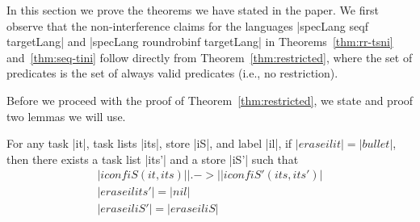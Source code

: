 In this section we prove the theorems we have stated in the paper.
We first observe that the non-interference claims for the languages
|specLang seqf targetLang| and |specLang roundrobinf targetLang|
in Theorems~\ref{thm:rr-tsni} and~\ref{thm:seq-tini} follow directly
from Theorem~\ref{thm:restricted}, where the set
of predicates is the set of always valid predicates (i.e., no restriction).

Before we proceed with the proof of Theorem~\ref{thm:restricted},
we state and proof two lemmas we will use.

\begin{lemma}
  \label{lemma:high-not-blocking}
  For any task |it|, task lists |its|, store |iS|, and label |il|, if
  $|erase il it|=|bullet|$, then there exists a task list
  |its'| and a store |iS'| such that
  \begin{align}
  |iconf iS (it, its)| |.->| |iconf iS' (its, its')| \label{eq:hnb-1} \\
  |erase il its'|=|nil| \label{eq:hnb-2}\\
  |erase il iS'|=|erase il iS| \label{eq:hnb-3}
  \end{align}
\end{lemma}
